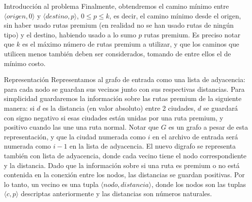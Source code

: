 \begin{subsection}{Introducción al problema}
Finalmente, obtendremos el camino m\'{i}nimo entre $\langle origen, 0 \rangle$ y $\langle destino, p \rangle$, $0 \leq p \leq k$, es decir, el camino m\'{i}nimo desde el origen, sin haber usado rutas premium (en realidad no se han usado rutas de ning\'{u}n tipo) y el destino, habiendo usado a lo sumo $p$ rutas premium. Es preciso notar que $k$ es el máximo número de rutas premium a utilizar, y que los caminos que utilicen menos también deben ser considerados, tomando de entre ellos el de mínimo costo.

\end{subsection}


\begin{subsection}{Representaci\'{o}n}
Representamos al grafo de entrada como una lista de adyacencia: para cada nodo se guardan sus vecinos junto con sus respectivas distancias.  Para simplicidad guardaremos la información sobre las rutas premium de la siguiente manera: si $d$ es la distancia (en valor absoluto) entre 2 ciudades, $d$ se guardará con signo negativo si esas ciudades est\'{a}n unidas por una ruta premium, y positivo cuando las une una ruta normal. Notar que $G$ es un grafo a pesar de esta representaci\'{o}n, y que la ciudad numerada como $i$ en el archivo de entrada será numerada como $i-1$ en la lista de adyacencia.
El nuevo digrafo se representa también con lista de adyacencia, donde cada vecino tiene el nodo correspondiente y la distancia. Dado que la información sobre si una ruta es premium o no está contenida en la conexión entre los nodos, las distancias se guardan positivas. Por lo tanto, un vecino es una tupla $\langle nodo, distancia \rangle$, donde los nodos son las tuplas $\langle c, p \rangle$ descriptas anteriormente y las distancias son números naturales.

\end{subsection}

